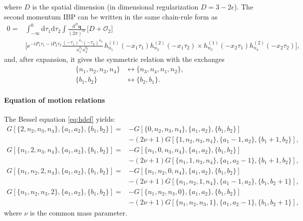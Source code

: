\documentclass[a4paper,12pt]{article}
\newcommand{\FR}[2]{\displaystyle\frac{\,{#1}\,}{#2}}
\def\di{{\mathrm{d}}}
\def\ii{\mathrm{i}}
\def\ep{\epsilon}
\begin{document}
where $D$ is the spatial dimension (in dimensional regularization $D=3-2\ep$). The second momentum IBP can be written in the same chain-rule form as
\begin{align}
	0 ={}& \int_{-\infty}^0 \di\tau_1\di\tau_2\int \FR{\di^D \bm q}{(2\pi)^D}\,
	\Big[D+\mathcal{O}_2\Big]\nonumber\\
	&\Bigg[
	e^{-\ii P_1\tau_1-\ii P_2\tau_2}
	\frac{(-\tau_1)^{a_1}(-\tau_2)^{a_2}}{x_1^{b_1}x_2^{b_2}}\,
	h_{n_1}^{(1)}(-x_1\tau_1)h_{n_2}^{(2)}(-x_1\tau_2) \times h_{n_3}^{(1)}(-x_2\tau_1)h_{n_4}^{(2)}(-x_2\tau_2)\Bigg], \label{eq:momIBP_qk_chainrule}
\end{align}
and, after expansion, it gives the symmetric relation with the exchanges
\begin{align}
	\{n_1,n_2,n_3,n_4\} &\leftrightarrow \{n_3,n_4,n_1,n_2\}, \nonumber\\
	\{b_1,b_2\} &\leftrightarrow \{b_2,b_1\}. \nonumber
\end{align}

\paragraph{Equation of motion relations}
The Bessel equation \eqref{eq:hdef} yields:
\begin{align}
	G[\{2,n_2,n_3,n_4\},\{a_1,a_2\},\{b_1,b_2\}] = & - G[\{0,n_2,n_3,n_4\},\{a_1,a_2\},\{b_1,b_2\}]\nonumber      \\
	                                               & - (2\nu+1) G[\{1,n_2,n_3,n_4\},\{a_1-1,a_2\},\{b_1+1,b_2\}], \\
	G[\{n_1,2,n_3,n_4\},\{a_1,a_2\},\{b_1,b_2\}] = & - G[\{n_1,0,n_3,n_4\},\{a_1,a_2\},\{b_1,b_2\}]\nonumber      \\
	                                               & - (2\nu+1) G[\{n_1,1,n_3,n_4\},\{a_1,a_2-1\},\{b_1+1,b_2\}], \\
	G[\{n_1,n_2,2,n_4\},\{a_1,a_2\},\{b_1,b_2\}] = & - G[\{n_1,n_2,0,n_4\},\{a_1,a_2\},\{b_1,b_2\}]\nonumber      \\
	                                               & - (2\nu+1) G[\{n_1,n_2,1,n_4\},\{a_1-1,a_2\},\{b_1,b_2+1\}], \\
	G[\{n_1,n_2,n_3,2\},\{a_1,a_2\},\{b_1,b_2\}] = & - G[\{n_1,n_2,n_3,0\},\{a_1,a_2\},\{b_1,b_2\}]\nonumber      \\
	                                               & - (2\nu+1) G[\{n_1,n_2,n_3,1\},\{a_1,a_2-1\},\{b_1,b_2+1\}],
\end{align}
where $\nu$ is the common mass parameter.
\end{document}
